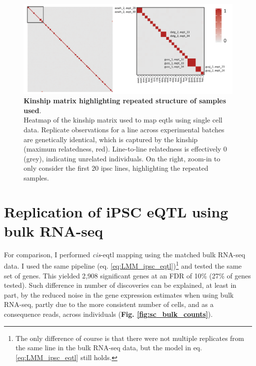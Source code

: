 \begin{figure}[h]
\centering
\includegraphics[width=14.5cm]{Chapter3/Fig/kinship_repeatedness.png}
\caption[Kinship for repeated samples]{\textbf{Kinship matrix highlighting repeated structure of samples used}.\\
Heatmap of the kinship matrix used to map \glspl{eqtl} using single cell data.
Replicate observations for a line across experimental batches are genetically identical, which is captured by the kinship (maximum relatedness, red).
Line-to-line relatedness is effectively 0 (grey), indicating unrelated individuals. 
On the right, zoom-in to only consider the first 20 \gls{ipsc} lines, highlighting the repeated samples.}
\label{fig:kinship_repeats}
\end{figure}


\newpage

\section{Replication of iPSC eQTL using bulk RNA-seq}

For comparison, I performed \textit{cis}-\gls{eqtl} mapping using the matched bulk RNA-seq data.
I used the same pipeline (eq. \eqref{eq:LMM_ipsc_eqtl})\footnote{The only difference of course is that there were not multiple replicates from the same line in the bulk RNA-seq data, but the model in eq. \eqref{eq:LMM_ipsc_eqtl} still holds.} and tested the same set of genes. 
This yielded 2,908 significant genes at an FDR of 10\% (27\% of genes tested).
Such difference in number of discoveries can be explained, at least in part, by the reduced noise in the gene expression estimates when using bulk RNA-seq, partly due to the more consistent number of cells, and as a consequence reads, across individuals (\textbf{Fig. \ref{fig:sc_bulk_counts}}). \\

